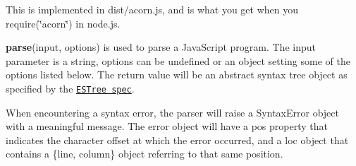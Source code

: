 This is implemented in {\ttfamily dist/acorn.\+js}, and is what you get when you {\ttfamily require(\char`\"{}acorn\char`\"{})} in node.\+js.

{\bfseries parse}{\ttfamily (input, options)} is used to parse a Java\+Script program. The {\ttfamily input} parameter is a string, {\ttfamily options} can be undefined or an object setting some of the options listed below. The return value will be an abstract syntax tree object as specified by the \href{https://github.com/estree/estree}{\tt E\+S\+Tree spec}.

When encountering a syntax error, the parser will raise a {\ttfamily Syntax\+Error} object with a meaningful message. The error object will have a {\ttfamily pos} property that indicates the character offset at which the error occurred, and a {\ttfamily loc} object that contains a {\ttfamily \{line, column\}} object referring to that same position.


